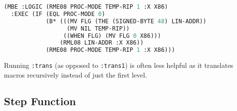 \documentclass[a4paper]{article}
\begin{document}
\begin{lstlisting}[language=lisp]
(MBE :LOGIC (RME08 PROC-MODE TEMP-RIP 1 :X X86)
  :EXEC (IF (EQL PROC-MODE 0)
            (B* (((MV FLG (THE (SIGNED-BYTE 48) LIN-ADDR))
                  (MV NIL TEMP-RIP))
                 ((WHEN FLG) (MV FLG 0 X86)))
                (RML08 LIN-ADDR :X X86))
            (RME08 PROC-MODE TEMP-RIP 1 :X X86)))
\end{lstlisting}

Running \texttt{:trans} (as opposed to \texttt{:trans1}) is often less helpful as it translates macros recursively instead of just the first level.


\subsection{Step Function}
\end{document}
